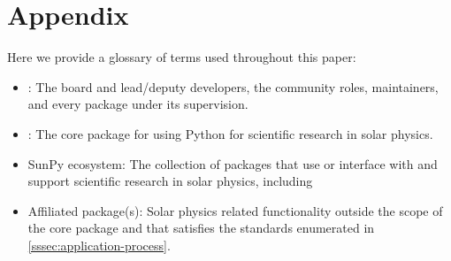 \section*{Appendix}
\label{sec:appendix}

Here we provide a glossary of terms used throughout this paper:

\begin{itemize}
\item \sunpyproj: The board and lead/deputy developers, the community roles, maintainers, and every package under its supervision.
\item \sunpypkg: The core package for using Python for scientific research in solar physics.
\item SunPy ecosystem: The collection of packages that use or interface with \sunpypkg and support scientific research in solar physics, including \sunpypkg
\item Affiliated package(s): Solar physics related functionality outside the scope of the \sunpypkg core package and that satisfies the standards enumerated in \autoref{sssec:application-process}.
\end{itemize}
